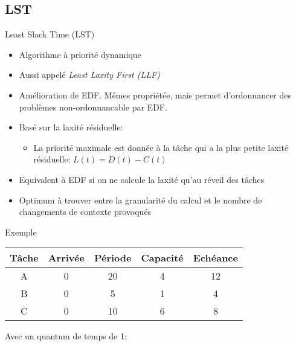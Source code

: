 \subsection{LST}

\begin{frame}{Least Slack Time (LST)} 
  \begin{itemize}
  \item Algorithme à priorité dynamique
  \item Aussi appelé \emph{Least Laxity First (LLF)}
  \item   Amélioration   de  EDF.   Mêmes   propriétée,  mais   permet
    d'ordonnancer des problèmes non-ordonnancable par EDF.
  \item Basé sur la laxité résiduelle: 
    \begin{itemize}
    \item La  priorité maximale est  donnée à la  tâche qui a  la plus
      petite laxité résiduelle: $L(t) = D(t) - C(t)$
    \end{itemize}
  \item Equivalent à  EDF si on ne calcule la  laxité qu'au réveil des
    tâches
  \item Optimum à trouver entre  la granularité du calcul et le nombre
    de changements de  contexte provoqués 
  \end{itemize}
\end{frame}

\begin{frame}{Exemple}
  \begin{center}
    \begin{tabular}{ccccc}
      \hline
      Tâche & Arrivée & Période & Capacité & Echéance \\
      \hline
      A & 0 & 20 & 4 & 12\\
      B & 0 &  5 & 1 & 4\\
      C & 0 & 10 & 6 & 8\\
      \hline
    \end{tabular}
  \end{center}
  Avec un quantum de temps de 1:
\end{frame} 

